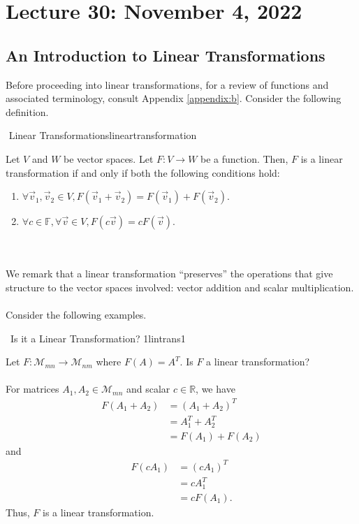 \section{Lecture 30: November 4, 2022}

    \subsection{An Introduction to Linear Transformations}

        Before proceeding into linear transformations, for a review of functions and associated terminology, consult Appendix \ref{appendix:b}. Consider the following definition.
        \begin{definition}{\Stop\,\,Linear Transformations}{lineartransformation}

            Let \(V\) and \(W\) be vector spaces. Let \(F:V\to W\) be a function. Then, \(F\) is a linear transformation if and only if both the following conditions hold:
            \begin{enumerate}
                \item \(\forall \vec{v}_1,\vec{v}_2\in V, F(\vec{v}_1+\vec{v}_2)=F(\vec{v}_1)+F(\vec{v}_2)\).
                \item \(\forall c\in\mathbb{F},\forall\vec{v}\in V, F(c\vec{v})=cF(\vec{v})\).
            \end{enumerate}
            
        \end{definition}
        \vphantom
        \\
        \\
        We remark that a linear transformation ``preserves'' the operations that give structure to the vector spaces involved: vector addition and scalar multiplication.
        \pagebreak
        \\
        \\
        Consider the following examples.
        \begin{example}{\Difficulty\,\Difficulty\,\,Is it a Linear Transformation? 1}{lintrans1}

            Let \(F:\mathcal{M}_{mn}\to \mathcal{M}_{nm}\) where \(F(A)=A^T\). Is \(F\) a linear transformation?
            \\
            \\
            For matrices \(A_1,A_2\in\mathcal{M}_{mn}\) and scalar \(c\in\mathbb{R}\), we have
            \begin{align*}
                F(A_1+A_2)&=(A_1+A_2)^T \\
                &=A_1^T+A_2^T \\
                &=F(A_1)+F(A_2)
            \end{align*}
            and
            \begin{align*}
                F(cA_1)&=(cA_1)^T \\
                &=cA_1^T \\
                &=cF(A_1).
            \end{align*}
            Thus, \(F\) is a linear transformation.
            
        \end{example}
